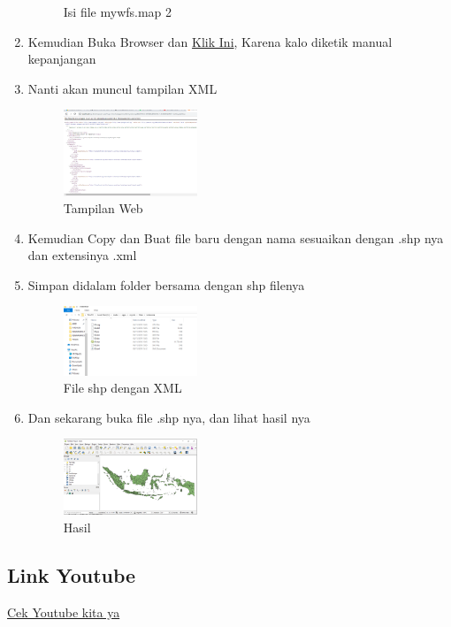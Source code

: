 \begin{enumerate}
\begin{figure}[H]
		\centering
		\caption{Isi file mywfs.map 2}
    \end{figure}
  \item Kemudian Buka Browser dan \href{http://localhost:8080/cgi-bin/mapserv.exe?map=/ms4w/apps/mywfs/mywfs.map&SERVICE=WFS&VERSION=1.0.0&REQUEST=GetCapabilities}{Klik Ini}, Karena kalo diketik manual kepanjangan
  \item Nanti akan muncul tampilan XML
  \hfill\break
    \begin{figure}[H]
		\includegraphics[width=4cm]{figures/1174096/4/g14.PNG}
		\centering
		\caption{Tampilan Web}
    \end{figure}
  \item Kemudian Copy dan Buat file baru dengan nama sesuaikan dengan .shp nya dan extensinya .xml
  \item Simpan didalam folder bersama dengan shp filenya
  \hfill\break
  \begin{figure}[H]
  \includegraphics[width=4cm]{figures/1174096/4/g15.PNG}
  \centering
  \caption{File shp dengan XML}
  \end{figure}
  \item Dan sekarang buka file .shp nya, dan lihat hasil nya
  \hfill\break
  \begin{figure}[H]
  \includegraphics[width=4cm]{figures/1174096/4/g16.PNG}
  \centering
  \caption{Hasil}
  \end{figure}
\end{enumerate}
\subsection{Link Youtube}
\href{https://youtu.be/hgoMt1xKjMo}{Cek Youtube kita ya}